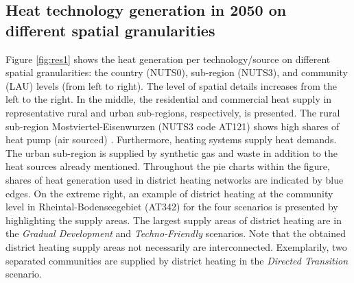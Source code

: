 \subsection{Heat technology generation in 2050 on different spatial granularities}\label{res:2}
Figure \ref{fig:res1} shows the heat generation per technology/source on different spatial granularities: the country (NUTS0), sub-region (NUTS3), and community (LAU) levels (from left to right). The level of spatial details increases from the left to the right. In the middle, the residential and commercial heat supply in representative rural and urban sub-regions, respectively, is presented. The rural sub-region Mostviertel-Eisenwurzen (NUTS3 code AT121) shows high shares of heat pump (air sourced) . Furthermore,  heating systems supply heat demands. The urban sub-region  is supplied by synthetic gas and waste in addition to the heat sources already mentioned. Throughout the pie charts within the figure, shares of heat generation used in district heating networks are indicated by blue edges. On the extreme right, an example of district heating at the community level in Rheintal-Bodenseegebiet (AT342) for the four scenarios is presented by highlighting the supply areas. The largest supply areas of district heating are in the \textit{Gradual Development} and \textit{Techno-Friendly} scenarios. Note that the obtained district heating supply areas not necessarily are interconnected. Exemplarily, two separated communities are supplied by district heating in the \textit{Directed Transition} scenario.

